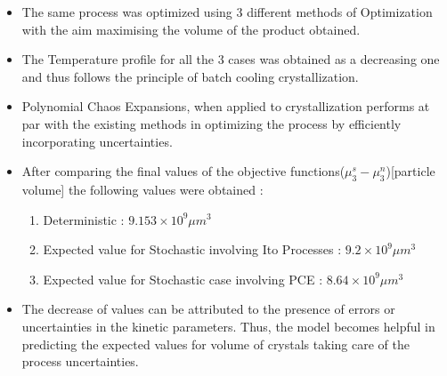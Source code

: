 \documentclass[3p,times,authoryear]{elsarticle}
\begin{document}
\begin{itemize}
\item The same process was optimized using 3 different methods of Optimization with the aim maximising the volume of the product obtained. 
\item The Temperature profile for all the 3 cases was obtained as a decreasing one and thus follows the principle of batch cooling crystallization. 
\item Polynomial Chaos Expansions, when applied to crystallization performs at par with the existing methods in optimizing the process by efficiently incorporating uncertainties. 
\item After comparing the final values of the objective functions($\mu_{3}^{s}-\mu_{3}^{n}$)[particle volume] the following values were obtained : 
\begin{enumerate}
\item Deterministic : $ 9.153 \times 10^{9} \mu m^{3}$
\item Expected value for Stochastic involving Ito Processes : $9.2 \times 10^{9} \mu m^{3}$
\item Expected value for Stochastic case involving PCE : $8.64 \times 10^{9} \mu m^{3}$
\end{enumerate}
\item The decrease of values can be attributed to the presence of errors or uncertainties in the kinetic parameters. Thus, the model becomes helpful in predicting the expected values for volume of crystals taking care of the process uncertainties.
\end{itemize}








\clearpage



%

	

\end{document}
